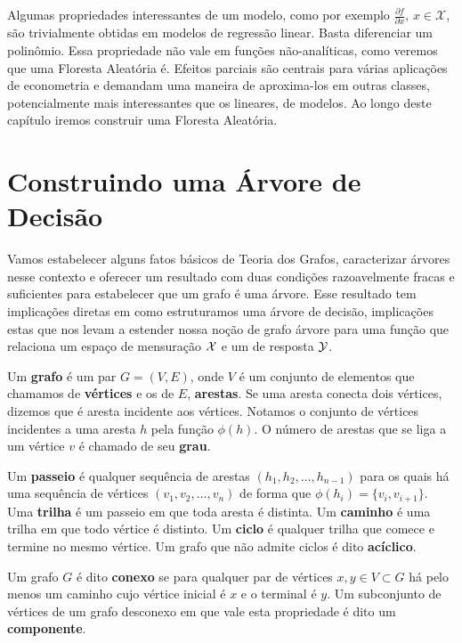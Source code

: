 Algumas propriedades interessantes de um modelo, como por exemplo $\frac{\partial f}{\partial x}, \, x \in \mathcal{X}$, são trivialmente obtidas em modelos de regressão linear. Basta diferenciar um polinômio. Essa propriedade não vale em funções não-analíticas, como veremos que uma Floresta Aleatória é. Efeitos parciais são centrais para várias aplicações de econometria e demandam uma maneira de aproxima-los em outras classes, potencialmente mais interessantes que os lineares, de modelos. Ao longo deste capítulo iremos construir uma Floresta Aleatória.

\section{Construindo uma Árvore de Decisão}

Vamos estabelecer alguns fatos básicos de Teoria dos Grafos, caracterizar árvores nesse contexto e oferecer um resultado com duas condições razoavelmente fracas e suficientes para estabelecer que um grafo é uma árvore. Esse resultado tem implicações diretas em como estruturamos uma árvore de decisão, implicações estas que nos levam a estender nossa noção de grafo árvore para uma função que relaciona um espaço de mensuração $\mathcal{X}$ e um de resposta $\mathcal{Y}$.

\begin{defi}[Grafos]
Um \textbf{grafo} é um par $G = (V, E)$, onde $V$ é um conjunto de elementos que chamamos de \textbf{vértices} e os de $E$, \textbf{arestas}. Se uma aresta conecta dois vértices, dizemos que é aresta incidente aos vértices. Notamos o conjunto de vértices incidentes a uma aresta $h$ pela função $\phi(h)$. O número de arestas que se liga a um vértice $v$ é chamado de seu \textbf{grau}.
\end{defi}

\begin{defi}
Um \textbf{passeio} é qualquer sequência de arestas $(h_1, h_2, ..., h_{n-1})$ para os quais há uma sequência de vértices $(v_1, v_2, ..., v_n)$ de forma que $\phi(h_i) = \{v_i, v_{i+1}\}$. Uma \textbf{trilha} é um passeio em que toda aresta é distinta. Um \textbf{caminho} é uma trilha em que todo vértice é distinto. Um \textbf{ciclo} é qualquer trilha que comece e termine no mesmo vértice. Um grafo que não admite ciclos é dito \textbf{acíclico}.
\end{defi}

\begin{defi}[Conexidade]
Um grafo $G$ é dito \textbf{conexo} se para qualquer par de vértices $x, y \in V \subset G$ há pelo menos um caminho cujo vértice inicial é $x$ e o terminal é $y$. Um subconjunto de vértices de um grafo desconexo em que vale esta propriedade é dito um \textbf{componente}.
\end{defi}


